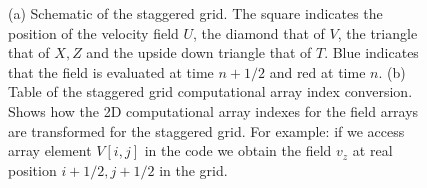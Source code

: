 \documentclass[10pt]{SelfArx} %
\theoremstyle{definition}
\begin{document}
\begin{figure}[hbt]
\caption{(a) Schematic of the staggered grid. The square indicates the position of the velocity field $U$, the diamond that of $V$, the triangle that of $X,Z$ and the upside down triangle that of $T$. Blue indicates that the field is evaluated at time $n+1/2$ and red at time $n$. (b) Table of the staggered grid computational array index conversion. Shows how the 2D computational array indexes for the field arrays are transformed for the staggered grid. For example: if we access array element $V[i,j]$ in the code we obtain the field $v_z$ at real position $i+1/2, j+1/2$ in the grid.}
\label{fig:staggered_grid}
\vspace{5pt}
\centering
{}
\qquad
{}

\end{figure}
\end{document}
